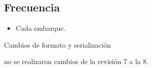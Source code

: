 \subsection{Frecuencia}

\begin{itemize}
	\item Cada embarque.
\end{itemize}

\begin{changelog}[simple, sectioncmd=\subsection*,label=changelog-2.10]
	\begin{version}[v=2.0, date=2023--01, author=Pablo E. Alanis]
		\item Cambios de formato y serialización
	\end{version}
	
	\begin{version}[v=1.8, date=2022-02, author=Alonso M.]
	\item no se realizaron cambios de la revisión 7 a la 8.
	\end{version}
\end{changelog}